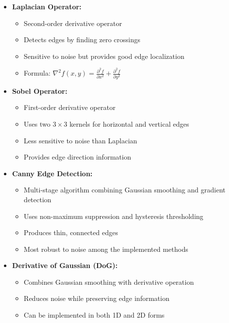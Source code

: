 \documentclass[12pt,a4paper]{article}
\begin{document}
\begin{itemize}
  \item \textbf{Laplacian Operator:}
    \begin{itemize}
      \item Second-order derivative operator
      \item Detects edges by finding zero crossings
      \item Sensitive to noise but provides good edge localization
      \item Formula: \(\nabla^2 f(x,y) = \frac{\partial^2 f}{\partial x^2} + \frac{\partial^2 f}{\partial y^2}\)
    \end{itemize}

  \item \textbf{Sobel Operator:}
    \begin{itemize}
      \item First-order derivative operator
      \item Uses two \(3 \times 3\) kernels for horizontal and vertical edges
      \item Less sensitive to noise than Laplacian
      \item Provides edge direction information
    \end{itemize}

  \item \textbf{Canny Edge Detection:}
    \begin{itemize}
      \item Multi-stage algorithm combining Gaussian smoothing and gradient detection
      \item Uses non-maximum suppression and hysteresis thresholding
      \item Produces thin, connected edges
      \item Most robust to noise among the implemented methods
    \end{itemize}

  \item \textbf{Derivative of Gaussian (DoG):}
    \begin{itemize}
      \item Combines Gaussian smoothing with derivative operation
      \item Reduces noise while preserving edge information
      \item Can be implemented in both 1D and 2D forms
    \end{itemize}
\end{itemize}
\end{document}
